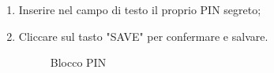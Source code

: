 \begin{enumerate}
	\item Inserire nel campo di testo il proprio PIN segreto;
	\item Cliccare sul tasto "SAVE" per confermare e salvare.

	\begin{figure}[!ht]
		\centering
		\caption{Blocco PIN}
	\end{figure}
\end{enumerate}

